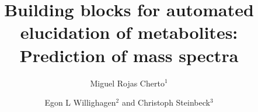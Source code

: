 \documentclass[10pt]{bmc_article}
\newenvironment{bmcformat}{\begin{raggedright}\baselineskip20pt\sloppy\setboolean{publ}{false}}{\end{raggedright}\baselineskip20pt\sloppy}
\begin{document}
\begin{bmcformat}



\title{Building blocks for automated elucidation of metabolites: Prediction of mass spectra}
 


\author{Miguel Rojas Cherto$^1$%
      \and
         Egon L Willighagen$^2$%
       and 
         Christoph Steinbeck\correspondingauthor$^3$%
      }
      


\address{%
    \iid(1)Analytical Sciences Department, Leiden University, Leiden, The Netherlands\\
    \iid(2)Biomedical Center, Uppsala University, Uppsala, Sweden\\
    \iid(3)European Bioinformatics Center (EBI), Wellcome Trust Genome Campus, Hinxton, Cambridge, UK
}%

\maketitle




\end{bmcformat}
\end{document}
